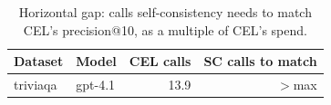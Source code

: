 \begin{table}[t]
\centering
\small
\begin{tabular}{llrr}
\toprule
Dataset & Model & CEL calls & SC calls to match \\
\midrule
triviaqa & gpt-4.1 & 13.9 & $>$max \\
\bottomrule
\end{tabular}
\caption{Horizontal gap: calls self-consistency needs to match CEL's precision@10, as a multiple of CEL's spend.}
\label{tab:hgap}
\end{table}
